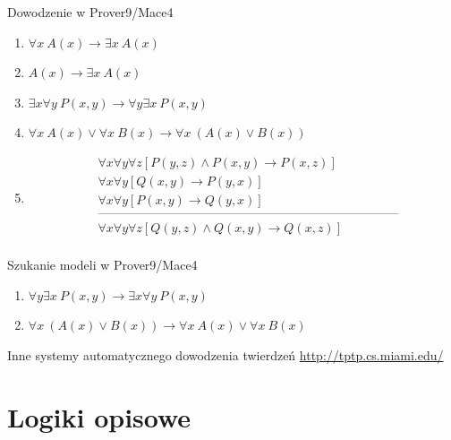 \documentclass{beamer}
\begin{document}
\begin{frame}{Dowodzenie w Prover9/Mace4}%
\begin{enumerate}
	\item $\forall x~ A(x) \to \exists x~ A(x)$%
	\item $A(x) \to \exists x~ A(x)$%
	\item $\exists x \forall y~ P(x,y) \to \forall y \exists x~ P(x, y)$%
	\item $\forall x~ A(x) \lor \forall x~ B(x) \to \forall x~ (A(x) \lor B(x))$%
	\item 
\begin{eqnarray*}
& \forall x \forall y \forall z [P(y,z) \land P(x,y) \to P(x,z)] \nonumber \\
& \forall x \forall y [Q(x,y) \to P(y,x)] \nonumber \\
& \forall x \forall y [P(x,y) \to Q(y,x)] \nonumber \\
& \textrm{------------------------------------------------------------------------}\nonumber \\
& \forall x \forall y \forall z [Q(y,z) \land Q(x,y) \to Q(x,z)] \nonumber \\
\end{eqnarray*}
\end{enumerate}
\end{frame}

\begin{frame}{Szukanie modeli w Prover9/Mace4}%
\begin{enumerate}
\item $\forall y \exists x~ P(x, y) \to \exists x \forall y~ P(x,y)$%
\item $\forall x~ (A(x) \lor B(x)) \to \forall x~ A(x) \lor \forall x~ B(x)$
\end{enumerate}
\end{frame}

\begin{frame}{Inne systemy automatycznego dowodzenia twierdzeń}%
\url{http://tptp.cs.miami.edu/}
\end{frame}

\section{Logiki opisowe}
\end{document}
